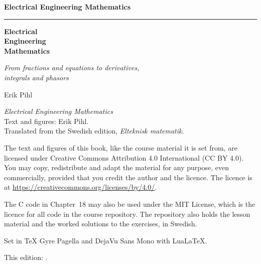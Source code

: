 %
\providecommand{\bookversion}{}

\thispagestyle{empty}
\vspace*{2.2in}
\begin{flushright}
  {\Large\bfseries Electrical Engineering Mathematics}
\end{flushright}
\cleardoublepage

\thispagestyle{empty}
\vspace*{1.1in}
\begin{flushleft}
  {\color{accent}\rule{0.9in}{2.5pt}}\par\vspace{1.4ex}
  {\fontsize{32}{38}\selectfont\bfseries Electrical\\[0.15ex] Engineering\\[0.15ex] Mathematics\par}
  \vspace{2.2ex}
  {\Large\itshape From fractions and equations to derivatives,\\integrals and phasors\par}
  \vspace{1.2in}
  {\large Erik Pihl\par}
  \vfill
  \ifx\bookversion\empty\else{\small\color{muted}\bookversion\par}\fi
\end{flushleft}
\newpage

\thispagestyle{empty}
\vspace*{\fill}
{\small
\noindent\textit{Electrical Engineering Mathematics}\\
Text and figures: Erik Pihl.\\
Translated from the Swedish edition, \textit{Elteknisk matematik}.

\medskip
\noindent The text and figures of this book, like the course material it is set from, are licensed
under Creative Commons Attribution 4.0 International (CC BY 4.0). You may copy, redistribute and
adapt the material for any purpose, even commercially, provided that you credit the author and
the licence. The licence is at \url{https://creativecommons.org/licenses/by/4.0/}.

\medskip
\noindent The C code in Chapter~18 may also be used under the MIT License, which is the licence
for all code in the course repository. The repository also holds the lesson material and the
worked solutions to the exercises, in Swedish.

\medskip
\noindent Set in TeX Gyre Pagella and DejaVu Sans Mono with Lua\LaTeX.

\ifx\bookversion\empty\else
\medskip
\noindent\textcolor{muted}{This edition: \bookversion.}
\fi
\par}
\cleardoublepage
